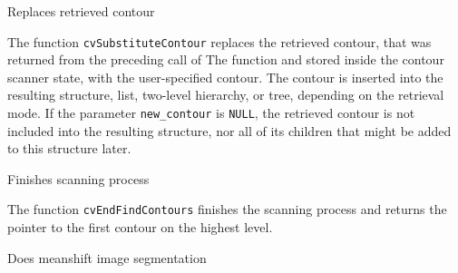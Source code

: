Replaces retrieved contour


\begin{description}
\end{description}

The function \texttt{cvSubstituteContour} replaces the retrieved
contour, that was returned from the preceding call of The function
 and stored inside the contour scanner
state, with the user-specified contour. The contour is inserted
into the resulting structure, list, two-level hierarchy, or tree,
depending on the retrieval mode. If the parameter \texttt{new\_contour}
is \texttt{NULL}, the retrieved contour is not included into the
resulting structure, nor all of its children that might be added
to this structure later.

\label{EndFindContours}

Finishes scanning process


\begin{description}
\end{description}

The function \texttt{cvEndFindContours} finishes the scanning process and returns the pointer to the first contour on the highest level.


Does meanshift image segmentation



